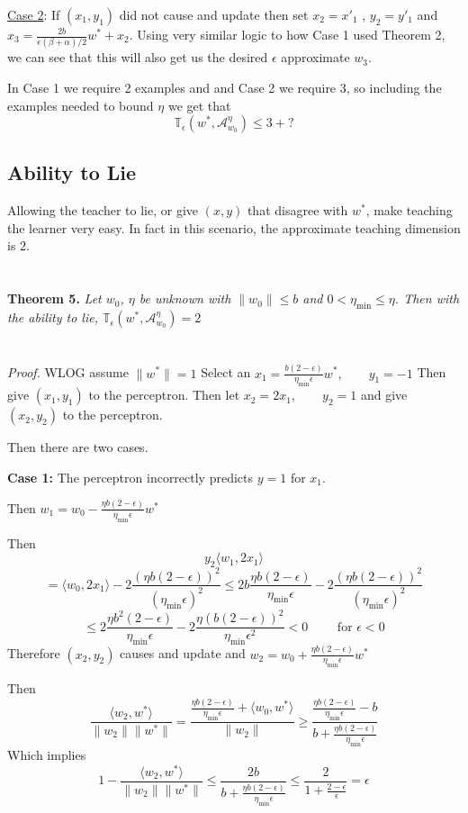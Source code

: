 \documentclass{article}
\newcommand{\learn}{\mathcal{A}_{w_0}^\eta}
\begin{document}
\underline{Case 2}: If $(x_1, y_1)$ did not cause and update then set $x_2 = x'_1$ , $y_2 = y'_1$ and $x_3 = \frac{2b}{\epsilon (\beta + \alpha)/2}w^* + x_2$. Using very similar logic to how Case 1 used Theorem 2, we can see that this will also get us the desired $\epsilon$ approximate $w_3$.

In Case 1 we require 2 examples and and Case 2 we require 3, so including the examples needed to bound $\eta$ we get that 
$$
\mathbb{T}_\epsilon(w^*, \learn) \leq 3 + ?
$$

\subsection{Ability to Lie}
Allowing the teacher to lie, or give $(x,y)$ that disagree with $w^*$, make teaching the learner very easy. In fact in this scenario, the approximate teaching dimension is $2$.
\\
\\
\\
\textbf{Theorem 5.} \textit{
Let $w_0$, $\eta$ be unknown with $\lVert w_0 \rVert \leq b$ and $0 < \eta_{\min} \leq \eta$.
Then with the ability to lie, $\mathbb{T}_{\epsilon}(w^*, \learn) = 2$
}
\\
\\
\\
\textit{Proof.}
WLOG assume $\lVert w^* \rVert = 1$
Select an $x_1 = \frac{b(2-\epsilon)}{\eta_{\min} \epsilon}w^*, \qquad y_1 = -1$
Then give $(x_1 , y _1)$ to the perceptron.
Then let $x_2 = 2x_1, \qquad y_2 = 1$ and give $(x_2, y_2)$ to the perceptron.

Then there are two cases.

\textbf{Case 1:} The perceptron incorrectly predicts $y = 1$ for $x_1$.

Then 
$
w_1 = w_0 - \frac{\eta b(2-\epsilon)}{\eta_{\min} \epsilon}w^*
$

Then 
$$y_2 \langle w_1, 2x_1 \rangle
$$
$$
 = \langle w_0, 2x_1 \rangle - 2\frac{(\eta b(2-\epsilon))^2}{(\eta_{\min}\epsilon)^2}
 \leq 2b\frac{\eta b(2-\epsilon)}{\eta_{\min}\epsilon}
-  2\frac{(\eta b(2-\epsilon))^2}{(\eta_{\min}\epsilon)^2} 
$$
$$
\leq 2\frac{\eta b^2(2-\epsilon)}{\eta_{\min}\epsilon}
-  2\frac{\eta (b(2-\epsilon))^2}{\eta_{\min}\epsilon^2}
< 0 \qquad \text{ for } \epsilon < 0
$$
Therefore $(x_2, y_2)$ causes and update and
$w_2 =  w_0 + \frac{\eta b(2-\epsilon)}{\eta_{\min} \epsilon}w^* $

Then
$$
\frac{\langle w_2 , w^* \rangle}{\lVert w_2 \rVert \lVert w^* \rVert} = \frac{\frac{\eta b(2-\epsilon)}{\eta_{\min} \epsilon} + \langle w_0, w^* \rangle}{\lVert w_2 \rVert} \geq \frac{\frac{\eta b(2-\epsilon)}{\eta_{\min} \epsilon} - b}{b + \frac{\eta b(2-\epsilon)}{\eta_{\min} \epsilon}}
$$
Which implies
$$
1 - \frac{\langle w_2 , w^* \rangle}{\lVert w_2 \rVert \lVert w^* \rVert} \leq \frac{2b}{b + \frac{\eta b(2-\epsilon)}{\eta_{\min} \epsilon}}
\leq
\frac{2}{1 + \frac{2-\epsilon}{\epsilon}} = \epsilon
$$
\end{document}
